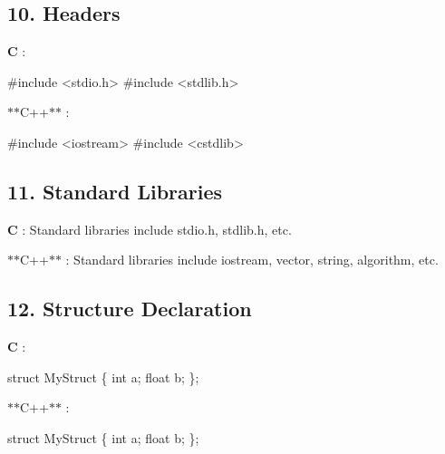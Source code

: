 \subsection*{10. Headers}


\begin{DoxyItemize}
\item {\bfseries C} \+: 
\begin{DoxyCode}
\textcolor{preprocessor}{#include <stdio.h>}
\textcolor{preprocessor}{#include <stdlib.h>}
\end{DoxyCode}

\item $\ast$$\ast$\+C++$\ast$$\ast$ \+: 
\begin{DoxyCode}
\textcolor{preprocessor}{#include <iostream>}
\textcolor{preprocessor}{#include <cstdlib>}
\end{DoxyCode}

\end{DoxyItemize}

\subsection*{11. Standard Libraries}


\begin{DoxyItemize}
\item {\bfseries C} \+: Standard libraries include {\ttfamily stdio.\+h}, {\ttfamily stdlib.\+h}, etc.
\item $\ast$$\ast$\+C++$\ast$$\ast$ \+: Standard libraries include {\ttfamily iostream}, {\ttfamily vector}, {\ttfamily string}, {\ttfamily algorithm}, etc.
\end{DoxyItemize}

\subsection*{12. Structure Declaration}


\begin{DoxyItemize}
\item {\bfseries C} \+: 
\begin{DoxyCode}
\textcolor{keyword}{struct }MyStruct \{
    \textcolor{keywordtype}{int} a;
    \textcolor{keywordtype}{float} b;
\};
\end{DoxyCode}

\item $\ast$$\ast$\+C++$\ast$$\ast$ \+: 
\begin{DoxyCode}
\textcolor{keyword}{struct }MyStruct \{
    \textcolor{keywordtype}{int} a;
    \textcolor{keywordtype}{float} b;
\};
\end{DoxyCode}

\end{DoxyItemize}

